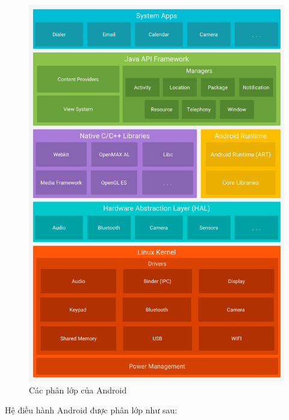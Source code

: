 \documentclass[../../thesis]{subfiles}
\begin{document}
\begin{figure}
    \centering
    \includegraphics[width=\linewidth]{../images/android-stack_2x.png}
    \vspace*{-10mm}
    \caption{Các phân lớp của Android}
    \label{fig:android-stack}
\end{figure}

Hệ điều hành Android được phân lớp như sau:
\end{document}
